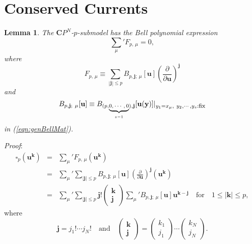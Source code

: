 \documentclass[makeidx,12pt,openany]{report}
\newtheorem{lem}[df]{Lemma}
\begin{document}
\section{Conserved Currents}
\begin{lem}\label{lem:CP-B-exp}
The ${\mathbf{C}}P^N$-$p$-submodel has the Bell polynomial expression 
\begin{equation}
 \sum_{\mu}{}'F_{p,\, \mu}=0, 
\end{equation}
where  
\begin{equation}
 F_{p,\, \mu} \equiv 
  \sum_{|\mathbf{j}| \le p}B_{p, \mathbf{j};\ \mu}[\mathbf{u}]
   \left( \frac{\partial}{\partial \mathbf{u}} \right)^{\mathbf{j}}
 \label{eqn:gBexp}
\end{equation}
and 
\begin{equation}
 B_{p, \mathbf{j};\ \mu}[\mathbf{u}] \equiv 
  B_{(p,\underbrace{\mbox{\scriptsize{$0,\cdots,0$}}}_{s-1}), \mathbf{j}}
  [\mathbf{u}(\mathbf{y})] 
   |_{y_1=x_{\mu}, \ y_2,\cdots,y_s:\mbox{\footnotesize{fix}}} 
\end{equation}
in (\ref{eqn:genBellMat}). 
\end{lem}
\textit{Proof}: \ 
\begin{eqnarray*}
 \square_p ({\mathbf{u}}^{\mathbf{k}})
 &=& \sum_{\mu}{}'F_{p,\, \mu}({\mathbf{u}}^{\mathbf{k}}) \\
 &=& \sum_{\mu}{}'\sum_{|\mathbf{j}| \le p}
  B_{p, \mathbf{j};\ \mu}[\mathbf{u}]
   \left( \frac{\partial}{\partial \mathbf{u}} \right)^{\mathbf{j}}
   ({\mathbf{u}}^{\mathbf{k}}) \\
 &=& \sum_{\mu}{}'\sum_{|\mathbf{j}| \le p} \mathbf{j}!
  \left(
       \begin{array}{cc}
       	 \mathbf{k} \\
       	 \mathbf{j}
       \end{array}
       \right)
  \sum_{\mu}{}'B_{p, \mathbf{j};\ \mu}[\mathbf{u}]
   \mathbf{u}^{\mathbf{k}-\mathbf{j}}
  \quad \mbox{for} \quad 1 \le |{\mathbf{k}}| \le p, 
\end{eqnarray*}
where 
$$
\mathbf{j}=j_1! \cdots j_N! \quad \mbox{and} \quad 
  \left(
       \begin{array}{cc}
       	 \mathbf{k} \\
       	 \mathbf{j}
       \end{array}
       \right)
 =\left(
       \begin{array}{cc}
       	 k_1 \\
       	 j_1
       \end{array}
       \right)
  \cdots 
  \left(
       \begin{array}{cc}
       	 k_N \\
       	 j_N
       \end{array}
       \right) . 
$$
\end{document}
